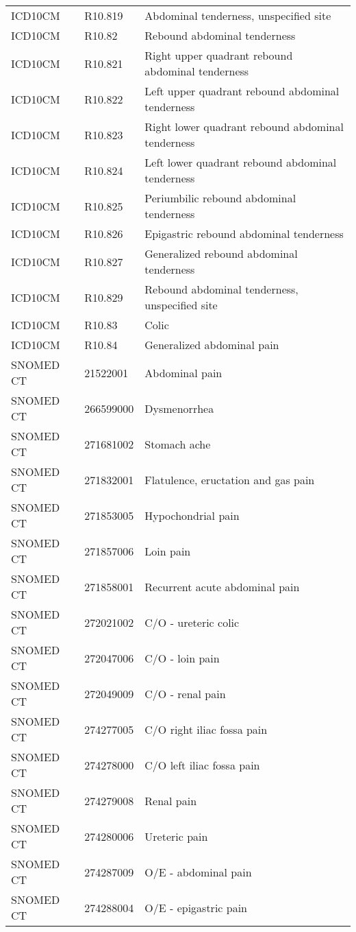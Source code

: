 \begin{longtable}{p{}p{}p{}}
  ICD10CM & R10.819 & Abdominal tenderness, unspecified site \\ 
  ICD10CM & R10.82 & Rebound abdominal tenderness \\ 
  ICD10CM & R10.821 & Right upper quadrant rebound abdominal tenderness \\ 
  ICD10CM & R10.822 & Left upper quadrant rebound abdominal tenderness \\ 
  ICD10CM & R10.823 & Right lower quadrant rebound abdominal tenderness \\ 
  ICD10CM & R10.824 & Left lower quadrant rebound abdominal tenderness \\ 
  ICD10CM & R10.825 & Periumbilic rebound abdominal tenderness \\ 
  ICD10CM & R10.826 & Epigastric rebound abdominal tenderness \\ 
  ICD10CM & R10.827 & Generalized rebound abdominal tenderness \\ 
  ICD10CM & R10.829 & Rebound abdominal tenderness, unspecified site \\ 
  ICD10CM & R10.83 & Colic \\ 
  ICD10CM & R10.84 & Generalized abdominal pain \\ 
  SNOMED CT & 21522001 & Abdominal pain \\ 
  SNOMED CT & 266599000 & Dysmenorrhea \\ 
  SNOMED CT & 271681002 & Stomach ache \\ 
  SNOMED CT & 271832001 & Flatulence, eructation and gas pain \\ 
  SNOMED CT & 271853005 & Hypochondrial pain \\ 
  SNOMED CT & 271857006 & Loin pain \\ 
  SNOMED CT & 271858001 & Recurrent acute abdominal pain \\ 
  SNOMED CT & 272021002 & C/O - ureteric colic \\ 
  SNOMED CT & 272047006 & C/O - loin pain \\ 
  SNOMED CT & 272049009 & C/O - renal pain \\ 
  SNOMED CT & 274277005 & C/O right iliac fossa pain \\ 
  SNOMED CT & 274278000 & C/O left iliac fossa pain \\ 
  SNOMED CT & 274279008 & Renal pain \\ 
  SNOMED CT & 274280006 & Ureteric pain \\ 
  SNOMED CT & 274287009 & O/E - abdominal pain \\ 
  SNOMED CT & 274288004 & O/E - epigastric pain \\ 

\end{longtable}
